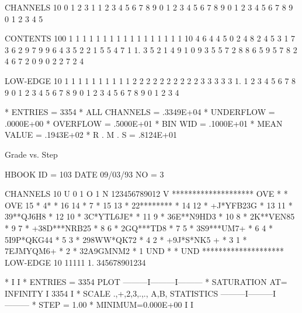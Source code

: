 \begin{Listing}
 CHANNELS  10    0                 1                   2                   3             
            1    1 2 3 4 5 6 7 8 9 0 1 2 3 4 5 6 7 8 9 0 1 2 3 4 5 6 7 8 9 0 1 2 3 4 5   
 
 CONTENTS 100              1                 1 1 1 1 1 1 1 1 1 1 1 1 1 1 1 1          
           10    4 6 4 4 5 0 2 4 8 2 4 5   3 1 7 3 6 2 9 7 9 9 6 4 3 5 2 2 1 5 5 4 7 1
            1.   3 5 2 1 4 9 1 0 9 3 5 5 7 2 8 8 6 5 9 5 7 8 2 4 6 7 2 0 9 0 2 2 7 2 4
 
 LOW-EDGE  10                       1 1 1 1 1 1 1 1 1 1 2 2 2 2 2 2 2 2 2 2 3 3 3 3 3 
            1.    1 2 3 4 5 6 7 8 9 0 1 2 3 4 5 6 7 8 9 0 1 2 3 4 5 6 7 8 9 0 1 2 3 4 
 
 * ENTRIES =       3354      * ALL CHANNELS =  .3349E+04      * UNDERFLOW =  .0000E+00      * OVERFLOW =  .5000E+01
 * BIN WID =  .1000E+01      * MEAN VALUE   =  .1943E+02      * R . M . S =  .8124E+01

 Grade vs. Step                                                                  
 
 HBOOK     ID =       103                                        DATE  09/03/93              NO =     3
 
 CHANNELS  10 U 0        1   O 
            1 N 123456789012 V 
            ********************
   OVE      *                  * OVE
    15      *   4*             *  16
    14      *    7             *  15
    13      *   22********     *  14
    12      *    +J*YFB23G     *  13
    11      *    39**QJ6H8     *  12
    10      *    3C*YTL6JE*    *  11
     9      *    36E**N9HD3    *  10
     8      *     2K**VEN85    *   9
     7      *   +38D***NRB25   *   8
     6      *    2GQ***TD8     *   7
     5      *    3S9***UM7+    *   6
     4      *    5I9P*QKG44    *   5
     3      *    298WW*QK72    *   4
     2      *    +9J*S*NK5 +   *   3
     1      *     7EJMYQM6+    *   2
            *    32A9GMNM2     *   1
   UND      *                  * UND
            ********************
 LOW-EDGE  10          11111
            1.  345678901234
 
  *                                                          I         I
  * ENTRIES =     3354                   PLOT       ---------I---------I---------
  * SATURATION  AT=     INFINITY                             I 3354    I
  * SCALE  .,+,2,3,.,., A,B,           STATISTICS   ---------I---------I---------
  * STEP = 1.00     * MINIMUM=0.000E+00                      I         I
\end{Listing}

\endinput
